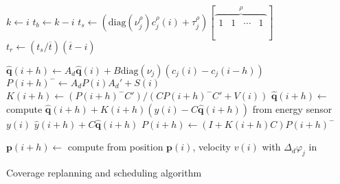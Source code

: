 \begin{algorithm}[h!]
{    {\normalsize $k\gets i$}\;\label{algo:repla:initbat}
    {\normalsize $t_b\gets k-i$}\;\label{algo:repla:endbat}%
    {\normalsize $t_s\gets(\mathrm{diag}(\nu_j^\rho)c_j^\rho(i)+\tau_j^\rho)[\overbrace{\begin{matrix}1&1&\cdots&1\end{matrix}}^{\rho}]$}\;\label{algo:repla:configtime}%
    {\normalsize $t_r\gets(t_s/\overline{t})(\overline{t}-i)$}\label{algo:repla:loosingmyreligiontime}\;%
    \vspace{1.6ex}

    {\normalsize $\hat{\mathbf{q}}(i+h)\gets A_d\hat{\mathbf{q}}(i)+B\mathrm{diag}{(\nu_j)}(c_j(i)-c_j(i-h))$}\;\label{algo:repla:sysevo}
    {\normalsize $P(i+h)^-\gets A_d P(i)A_d'+S(i)$}\;\label{algo:repla:covesterrorpri}
    {\normalsize $K(i+h)\gets (P(i+h)^-C')/(CP(i+h)^-C'+V(i))$}\;\label{algo:repla:goodoldkalmygains}
    {\normalsize $\hat{\mathbf{q}}(i+h)\gets${ \otherfont compute }$\hat{\mathbf{q}}(i+h)+K(i+h)(y(i)-C\hat{\mathbf{q}}(i+h))${ \otherfont from energy sensor }$y(i)$}\;\label{algo:repla:apoststate}
    {\normalsize $\hat{y}(i+h)+C\hat{\mathbf{q}}(i+h)$}\;
    {\normalsize $P(i+h)\gets (I+K(i+h)C)P(i+h)^-$}\;\label{algo:repla:endkalmy}
    \vspace{.8ex}
    
    {\normalsize $\mathbf{p}(i+h)\gets${ \otherfont compute from position }$\mathbf{p}(i)${\otherfont , velocity }\normalfont $v(i)${ \otherfont with }\normalfont $\Delta_d\varphi_j${ \otherfont in }}\;\label{algo:repla:gvf}
  }
  \vspace{1.6ex}

  \caption{Coverage replanning and scheduling algorithm}
  \label{algo:repla}
\end{algorithm}

